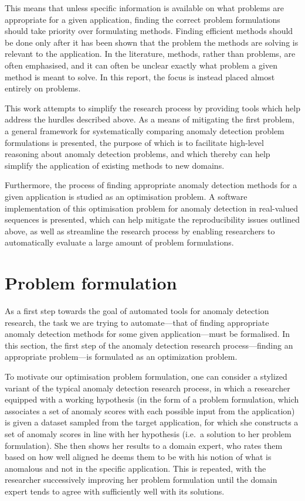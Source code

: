 This means that unless specific information is available on what problems are appropriate for a given application, finding the correct problem formulations should take priority over formulating methods. Finding efficient methods should be done only after it has been shown that the problem the methods are solving is relevant to the application. In the literature, methods, rather than problems, are often emphasised, and it can often be unclear exactly what problem a given method is meant to solve. In this report, the focus is instead placed almost entirely on problems.

This work attempts to simplify the research process by providing tools which help address the hurdles described above. As a means of mitigating the first problem, a general framework for systematically comparing anomaly detection problem formulations is presented, the purpose of which is to facilitate high-level reasoning about anomaly detection problems, and which thereby can help simplify the application of existing methods to new domains.

Furthermore, the process of finding appropriate anomaly detection methods for a given application is studied as an optimisation problem. A software implementation of this optimisation problem for anomaly detection in real-valued sequences is presented, which can help mitigate the reproducibility issues outlined above, as well as streamline the research process by enabling researchers to automatically evaluate a large amount of problem formulations.

\section{Problem formulation}
\label{sect:problem_formulation}
As a first step towards the goal of automated tools for anomaly detection research, the task we are trying to automate–--that of finding appropriate anomaly detection methods for some given application---must be formalised. In this section, the first step of the anomaly detection research process---finding an appropriate problem---is formulated as an optimization problem.

To motivate our optimisation problem formulation, one can consider a stylized variant of the typical anomaly detection research process, in which a researcher equipped with a working hypothesis (in the form of a problem formulation, which associates a set of anomaly scores with each possible input from the application) is given a dataset sampled from the target application, for which she constructs a set of anomaly scores in line with her hypothesis (i.e.\ a solution to her problem formulation). She then shows her results to a domain expert, who rates them based on how well aligned he deems them to be with his notion of what is anomalous and not in the specific application. This is repeated, with the researcher successively improving her problem formulation until the domain expert tends to agree with sufficiently well with its solutions.

